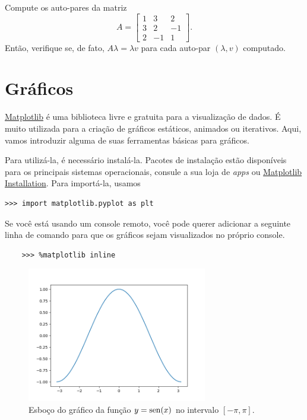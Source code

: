 \documentclass[12pt]{article}
\begin{document}
\begin{exr}
  Compute os auto-pares da matriz
  \begin{equation}
    A =
    \begin{bmatrix}
      1 & 3 & 2\\
      3 & 2 & -1\\
      2 & -1 & 1
    \end{bmatrix}.
  \end{equation}
  Então, verifique se, de fato, $A\lambda = \lambda v$ para cada auto-par $(\lambda, v)$ computado.
\end{exr}

\section{Gráficos}\label{sec_graf}

\href{https://matplotlib.org/}{Matplotlib} é uma biblioteca {\python} livre e gratuita para a visualização de dados. É muito utilizada para a criação de gráficos estáticos, animados ou iterativos. Aqui, vamos introduzir alguma de suas ferramentas básicas para gráficos.

Para utilizá-la, é necessário instalá-la. Pacotes de instalação estão disponíveis para os principais sistemas operacionais, consule a sua loja de {\it apps} ou \href{https://matplotlib.org/stable/users/installing.html}{Matplotlib Installation}. Para importá-la, usamos
\begin{lstlisting}
>>> import matplotlib.pyplot as plt
\end{lstlisting}

\begin{obs}
  Se você está usando um console {\python} remoto, você pode querer adicionar a seguinte linha de comando para que os gráficos sejam visualizados no próprio console.
  \begin{lstlisting}
    >>> %matplotlib inline
  \end{lstlisting}
\end{obs}

\begin{figure}[h]
  \centering
  \includegraphics[width=0.7\textwidth]{./data/sen}
  \caption{Esboço do gráfico da função $y=\operatorname{sen}(x)$ no intervalo $[-\pi,\pi]$.}
  \label{fig:sen}
\end{figure}
\end{document}
